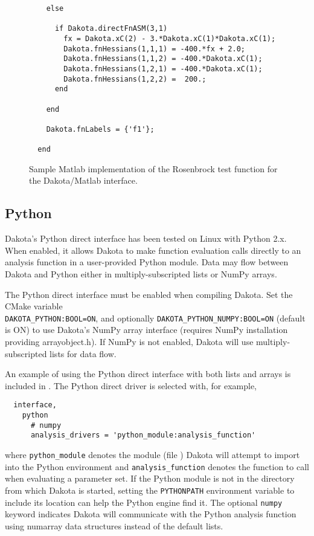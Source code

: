 \begin{figure}
\begin{bigbox}
\begin{tiny}
\begin{verbatim}
    else
    
      if Dakota.directFnASM(3,1) 
        fx = Dakota.xC(2) - 3.*Dakota.xC(1)*Dakota.xC(1);
        Dakota.fnHessians(1,1,1) = -400.*fx + 2.0;
        Dakota.fnHessians(1,1,2) = -400.*Dakota.xC(1); 
        Dakota.fnHessians(1,2,1) = -400.*Dakota.xC(1);
        Dakota.fnHessians(1,2,2) =  200.;
      end
    
    end
  
    Dakota.fnLabels = {'f1'};
   
  end
\end{verbatim}
\end{tiny}
\end{bigbox}
\caption{Sample Matlab implementation of the Rosenbrock test function
for the Dakota/Matlab interface.\label{advint:figure:matlabrosen}}
\end{figure}

\subsection{Python}\label{advint:existingdirect:python} 

Dakota's Python direct interface has been tested on Linux with Python
2.x. When enabled, it allows Dakota to make function evaluation calls
directly to an analysis function in a user-provided Python module.
Data may flow between Dakota and Python either in multiply-subscripted
lists or NumPy arrays.

The Python direct interface must be enabled when compiling Dakota.
Set the CMake variable \\ {\tt DAKOTA\_PYTHON:BOOL=ON}, and optionally
{\tt DAKOTA\_PYTHON\_NUMPY:BOOL=ON} (default is ON) to use Dakota's
NumPy array interface (requires NumPy installation providing
arrayobject.h). If NumPy is not enabled, Dakota will use
multiply-subscripted lists for data flow.

An example of using the Python direct interface with both lists and
arrays is included in
. The Python direct driver is
selected with, for example,
\begin{verbatim}
  interface,
    python
      # numpy
      analysis_drivers = 'python_module:analysis_function'
\end{verbatim}
where {\tt python\_module} denotes the module (file
) Dakota will attempt to import into the Python
environment and {\tt analysis\_function} denotes the function to call
when evaluating a parameter set. If the Python module is not in the
directory from which Dakota is started, setting the {\tt PYTHONPATH}
environment variable to include its location can help the Python
engine find it.  The optional {\tt numpy} keyword indicates Dakota
will communicate with the Python analysis function using numarray data
structures instead of the default lists.


